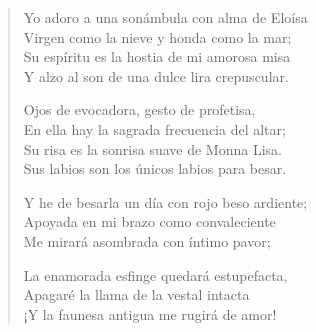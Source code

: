 \documentclass[12pt]{article}
\begin{document}
\clearpage
{}
\begin{verse}

Yo adoro a una sonámbula con alma de Eloísa\\
Virgen como la nieve y honda como la mar;\\
Su espíritu es la hostia de mi amorosa misa\\
Y alzo al son de una dulce lira crepuscular.  

Ojos de evocadora, gesto de profetisa,\\
En ella hay la sagrada frecuencia del altar;\\
Su risa es la sonrisa suave de Monna Lisa.\\
Sus labios son los únicos labios para besar.  

Y he de besarla un día con rojo beso ardiente;\\
Apoyada en mi brazo como convaleciente\\
Me mirará asombrada con íntimo pavor;  

La enamorada esfinge quedará estupefacta,\\
Apagaré la llama de la vestal intacta\\
¡Y la faunesa antigua me rugirá de amor!  

\end{verse}
\end{document}
